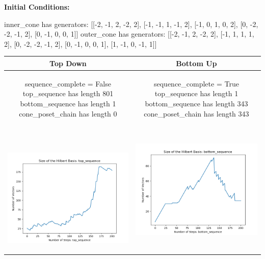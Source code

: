 \documentclass[10pt]{article}
\begin{document}
\textbf{Initial Conditions:}
\begin{SAGE}
inner_cone has generators: 
[[-2, -1, 2, -2, 2], [-1, -1, 1, -1, 2], [-1, 0, 1, 0, 2], [0, -2, -2, -1, 2], [0, -1, 0, 0, 1]]
outer_cone has generators: 
[[-2, -1, 2, -2, 2], [-1, 1, 1, 1, 2], [0, -2, -2, -1, 2], [0, -1, 0, 0, 1], [1, -1, 0, -1, 1]]

\end{SAGE}
\begin{tabular}{c|c}
\textbf{Top Down} & \textbf{Bottom Up} \\ \hline  
\begin{SAGE}
	sequence_complete = False
	top_sequence has length 801
	bottom_sequence has length 1
	cone_poset_chain has length 0
\end{SAGE} 
&
\begin{SAGE}
	sequence_complete = True
	top_sequence has length 1
	bottom_sequence has length 343
	cone_poset_chain has length 343
\end{SAGE} 
\\ \hline
\
\begin{minipage}{.45\textwidth}
\includegraphics[width=\textwidth]{"DATA/5d/5 generators 2 bound F/top_sequence SIZE"}
\end{minipage} &
\begin{minipage}{.45\textwidth}
\includegraphics[width=\textwidth]{"DATA/5d/5 generators 2 bound F bottomup/bottom_sequence SIZE"}

\end{minipage}
\end{tabular}
\end{document}
